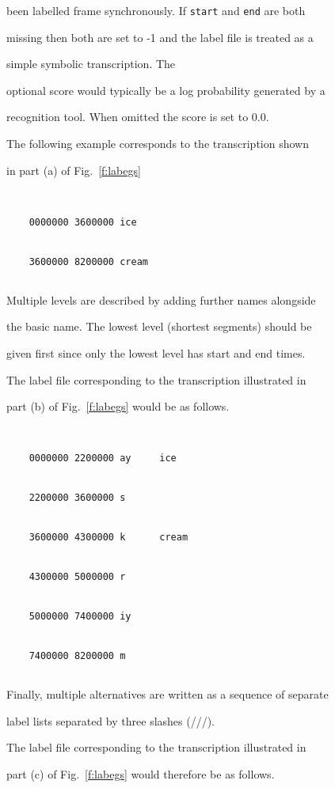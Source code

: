 been labelled frame synchronously.  If \texttt{start} and \texttt{end} are both


missing then both are set to -1 and the label file is treated as a 


simple symbolic transcription.  The


optional score would typically be a log probability generated by a 


recognition tool.  When omitted the score is set to 0.0.





The following example corresponds to the transcription shown


in part (a) of Fig.~\ref{f:labegs}


\begin{verbatim}


    0000000 3600000 ice


    3600000 8200000 cream


\end{verbatim}


Multiple levels are described by adding further names alongside


the basic name.  The lowest level (shortest segments) should be


given first since only the lowest level has start and end times.


The label file corresponding to the transcription illustrated in


part (b) of Fig.~\ref{f:labegs} would be as follows.


\begin{verbatim}


    0000000 2200000 ay     ice


    2200000 3600000 s


    3600000 4300000 k      cream


    4300000 5000000 r


    5000000 7400000 iy


    7400000 8200000 m


\end{verbatim}


Finally, multiple alternatives are written as a sequence of separate


label lists separated by three slashes (///).


The label file corresponding to the transcription illustrated in


part (c) of Fig.~\ref{f:labegs} would therefore be as follows.


